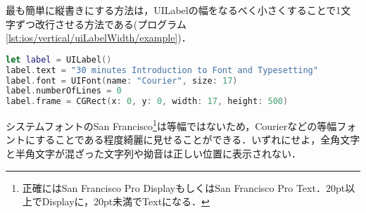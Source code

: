 最も簡単に縦書きにする方法は，{\sf UILabel}の幅をなるべく小さくすることで1文字ずつ改行させる方法である(プログラム\ref{lst:ios/vertical/uiLabelWidth/example})．

\begin{lstlisting}[language=swift,caption={\sf UILabel}の幅を縮小することによる縦書きの実現,label=lst:ios/vertical/uiLabelWidth/example]
let label = UILabel()
label.text = "30 minutes Introduction to Font and Typesetting"
label.font = UIFont(name: "Courier", size: 17)
label.numberOfLines = 0
label.frame = CGRect(x: 0, y: 0, width: 17, height: 500)
\end{lstlisting}

システムフォントのSan Francisco\footnote{正確にはSan Francisco Pro DisplayもしくはSan Francisco Pro Text．20pt以上でDisplayに，20pt未満でTextになる\cite{developer.apple.com:design/human-interface-guidelines/ios/visual-design/typography/}．}は等幅ではないため，Courierなどの等幅フォントにすることである程度綺麗に見せることができる．いずれにせよ，全角文字と半角文字が混ざった文字列や拗音は正しい位置に表示されない．

